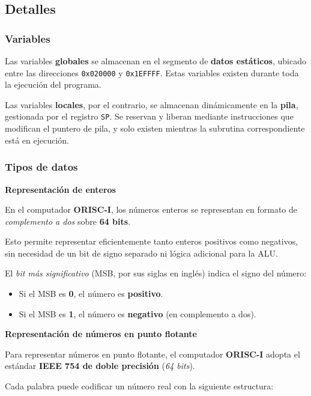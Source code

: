\documentclass{article}
\begin{document}
\subsection{Detalles}

\subsubsection{Variables}

Las variables \textbf{globales} se almacenan en el segmento de
\textbf{datos estáticos}, ubicado entre las direcciones
\texttt{0x020000} y \texttt{0x1EFFFF}. Estas variables
existen durante toda la ejecución del programa.

Las variables \textbf{locales}, por el contrario, se
almacenan dinámicamente en la \textbf{pila}, gestionada por
el registro \texttt{SP}. Se reservan y liberan mediante
instrucciones que modifican el puntero de pila,
y solo existen mientras la subrutina
correspondiente está en ejecución.

\subsubsection{Tipos de datos}

\textbf{Representación de enteros}

En el computador \textbf{ORISC-I}, los números enteros se representan en formato de \textit{complemento a dos} sobre \textbf{64 bits}.

Esto permite representar eficientemente tanto enteros positivos como negativos, sin necesidad de un bit de signo separado ni lógica adicional para la ALU.

El \textit{bit más significativo} (MSB, por sus siglas en inglés) indica el signo del número:

\begin{itemize}
  \item Si el MSB es \textbf{0}, el número es \textbf{positivo}.
  \item Si el MSB es \textbf{1}, el número es \textbf{negativo} (en complemento a dos).
\end{itemize}

\textbf{Representación de números en punto flotante}

Para representar números en punto flotante, el computador \textbf{ORISC-I} adopta el estándar \textbf{IEEE 754 de doble precisión} (\textit{64 bits}).

Cada palabra puede codificar un número real con la siguiente estructura:
\end{document}
